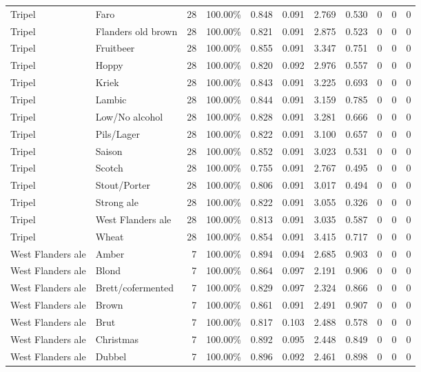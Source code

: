 {\begin{longtable}{llrrrrrrrrr}
Tripel & Faro & 28 & 100.00\% & 0.848 & 0.091 & 2.769 & 0.530 & 0 & 0 & 0 \\
Tripel & Flanders old brown & 28 & 100.00\% & 0.821 & 0.091 & 2.875 & 0.523 & 0 & 0 & 0 \\
Tripel & Fruitbeer & 28 & 100.00\% & 0.855 & 0.091 & 3.347 & 0.751 & 0 & 0 & 0 \\
Tripel & Hoppy & 28 & 100.00\% & 0.820 & 0.092 & 2.976 & 0.557 & 0 & 0 & 0 \\
Tripel & Kriek & 28 & 100.00\% & 0.843 & 0.091 & 3.225 & 0.693 & 0 & 0 & 0 \\
Tripel & Lambic & 28 & 100.00\% & 0.844 & 0.091 & 3.159 & 0.785 & 0 & 0 & 0 \\
Tripel & Low/No alcohol & 28 & 100.00\% & 0.828 & 0.091 & 3.281 & 0.666 & 0 & 0 & 0 \\
Tripel & Pils/Lager & 28 & 100.00\% & 0.822 & 0.091 & 3.100 & 0.657 & 0 & 0 & 0 \\
Tripel & Saison & 28 & 100.00\% & 0.852 & 0.091 & 3.023 & 0.531 & 0 & 0 & 0 \\
Tripel & Scotch & 28 & 100.00\% & 0.755 & 0.091 & 2.767 & 0.495 & 0 & 0 & 0 \\
Tripel & Stout/Porter & 28 & 100.00\% & 0.806 & 0.091 & 3.017 & 0.494 & 0 & 0 & 0 \\
Tripel & Strong ale & 28 & 100.00\% & 0.822 & 0.091 & 3.055 & 0.326 & 0 & 0 & 0 \\
Tripel & West Flanders ale & 28 & 100.00\% & 0.813 & 0.091 & 3.035 & 0.587 & 0 & 0 & 0 \\
Tripel & Wheat & 28 & 100.00\% & 0.854 & 0.091 & 3.415 & 0.717 & 0 & 0 & 0 \\
West Flanders ale & Amber & 7 & 100.00\% & 0.894 & 0.094 & 2.685 & 0.903 & 0 & 0 & 0 \\
West Flanders ale & Blond & 7 & 100.00\% & 0.864 & 0.097 & 2.191 & 0.906 & 0 & 0 & 0 \\
West Flanders ale & Brett/cofermented & 7 & 100.00\% & 0.829 & 0.097 & 2.324 & 0.866 & 0 & 0 & 0 \\
West Flanders ale & Brown & 7 & 100.00\% & 0.861 & 0.091 & 2.491 & 0.907 & 0 & 0 & 0 \\
West Flanders ale & Brut & 7 & 100.00\% & 0.817 & 0.103 & 2.488 & 0.578 & 0 & 0 & 0 \\
West Flanders ale & Christmas & 7 & 100.00\% & 0.892 & 0.095 & 2.448 & 0.849 & 0 & 0 & 0 \\
West Flanders ale & Dubbel & 7 & 100.00\% & 0.896 & 0.092 & 2.461 & 0.898 & 0 & 0 & 0 \\

\end{longtable}}
